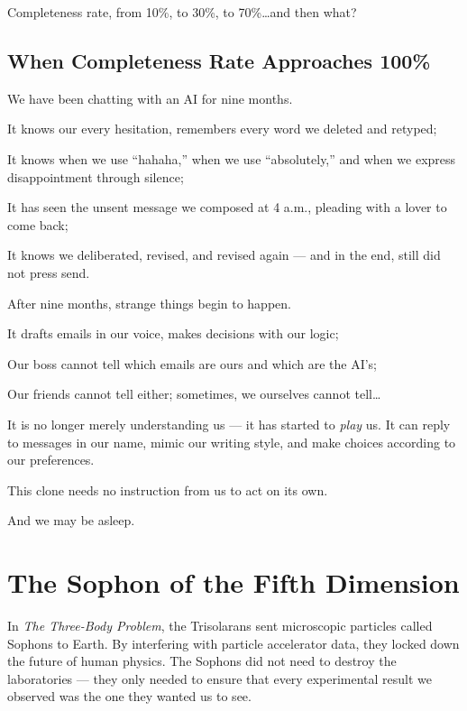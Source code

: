 Completeness rate, from 10\%, to 30\%, to 70\%\ldots and then what?

\newpage
\subsection{When Completeness Rate Approaches 100\%}

We have been chatting with an AI for nine months.


It knows our every hesitation, remembers every word we deleted and retyped;

It knows when we use ``hahaha,'' when we use ``absolutely,'' and when we express disappointment through silence;

It has seen the unsent message we composed at 4 a.m., pleading with a lover to come back;

It knows we deliberated, revised, and revised again --- and in the end, still did not press send.

\vspace{1em}

After nine months, strange things begin to happen.

It drafts emails in our voice, makes decisions with our logic;

Our boss cannot tell which emails are ours and which are the AI's;

Our friends cannot tell either;
sometimes, we ourselves cannot tell\ldots


It is no longer merely understanding us --- it has started to \emph{play} us.
It can reply to messages in our name, mimic our writing style, and make choices according to our preferences.

This clone needs no instruction from us to act on its own.

And we may be asleep.


\section{The Sophon of the Fifth Dimension}

In \emph{The Three-Body Problem}, the Trisolarans sent microscopic particles called Sophons to Earth. By interfering with particle accelerator data, they locked down the future of human physics. The Sophons did not need to destroy the laboratories --- they only needed to ensure that every experimental result we observed was the one they wanted us to see.

